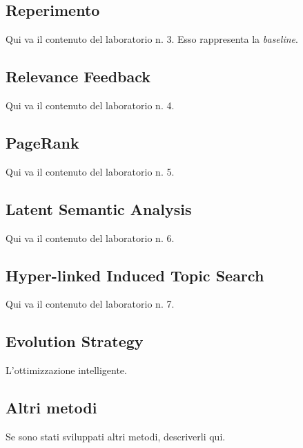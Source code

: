 \subsection{Reperimento}
\label{sec:metodi-di-reper}

Qui va il contenuto del laboratorio n. 3. Esso rappresenta la \textit{baseline}.

\subsection{Relevance Feedback}
\label{sec:relevance-feedback}

Qui va il contenuto del laboratorio n. 4.

\subsection{PageRank}
\label{sec:pagerank}

Qui va il contenuto del laboratorio n. 5.

\subsection{Latent Semantic Analysis}
\label{sec:lsa}

Qui va il contenuto del laboratorio n. 6.

\subsection{Hyper-linked Induced Topic Search}
\label{sec:hits}

Qui va il contenuto del laboratorio n. 7.

\subsection{Evolution Strategy}
\label{sec:es}

L'ottimizzazione intelligente.

\subsection{Altri metodi}
\label{sec:altri-metodi}

Se sono stati sviluppati altri metodi, descriverli qui.

